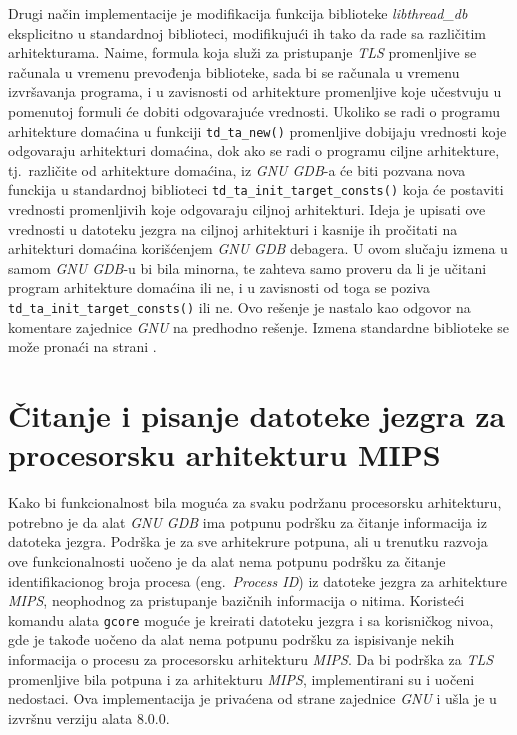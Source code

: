 \documentclass[12pt,oneside]{memoir}
\begin{document}
Drugi način implementacije je modifikacija funkcija biblioteke \emph{libthread\_db} eksplicitno u standardnoj biblioteci, modifikujući ih tako da rade sa različitim arhitekturama. Naime, formula koja služi za pristupanje \emph{TLS} promenljive se računala u vremenu prevođenja biblioteke, sada bi se računala u vremenu izvršavanja programa, i u zavisnosti od arhitekture promenljive koje učestvuju u pomenutoj formuli će dobiti odgovarajuće vrednosti. Ukoliko se radi o programu arhitekture domaćina u funkciji  \texttt{td\_ta\_new()} promenljive dobijaju vrednosti koje odgovaraju arhitekturi domaćina, dok ako se radi o programu ciljne arhitekture, tj.~različite od arhitekture domaćina, iz \emph{GNU GDB}-a će biti pozvana nova funckija u standardnoj biblioteci \texttt{td\_ta\_init\_target\_consts()} koja će postaviti vrednosti promenljivih koje odgovaraju ciljnoj arhitekturi. Ideja je upisati ove vrednosti u datoteku jezgra na ciljnoj arhitekturi i kasnije ih pročitati na arhitekturi domaćina korišćenjem \emph{GNU GDB} debagera. U ovom slučaju izmena u samom \emph{GNU GDB}-u bi bila minorna, te zahteva samo proveru da li je učitani program arhitekture domaćina ili ne, i u zavisnosti od toga se poziva \texttt{td\_ta\_init\_target\_consts()} ili ne. Ovo rešenje je nastalo kao odgovor na komentare zajednice \emph{GNU} na predhodno rešenje. Izmena standardne biblioteke se može pronaći na strani \cite{GLIBCPATCH}.

\section{Čitanje i pisanje datoteke jezgra za procesorsku arhitekturu MIPS}

Kako bi funkcionalnost bila moguća za svaku podržanu procesorsku arhitekturu, potrebno je da alat \emph{GNU GDB} ima potpunu podršku za čitanje informacija iz datoteka jezgra. Podrška je za sve arhitekrure potpuna, ali u trenutku razvoja ove funkcionalnosti uočeno je da alat nema potpunu podršku za čitanje identifikacionog broja procesa (eng.~\emph{Process ID}) iz datoteke jezgra za arhitekture \emph{MIPS}, neophodnog za pristupanje bazičnih informacija o nitima. Koristeći komandu alata \texttt{gcore} moguće je kreirati datoteku jezgra i sa korisničkog nivoa, gde je takođe uočeno da alat nema potpunu podršku za ispisivanje nekih informacija o procesu za procesorsku arhitekturu \emph{MIPS}. Da bi podrška za \emph{TLS} promenljive bila potpuna i za arhitekturu \emph{MIPS}, implementirani su i uočeni nedostaci. Ova implementacija je privaćena od strane zajednice \emph{GNU} i ušla je u izvršnu verziju alata 8.0.0.
\end{document}

